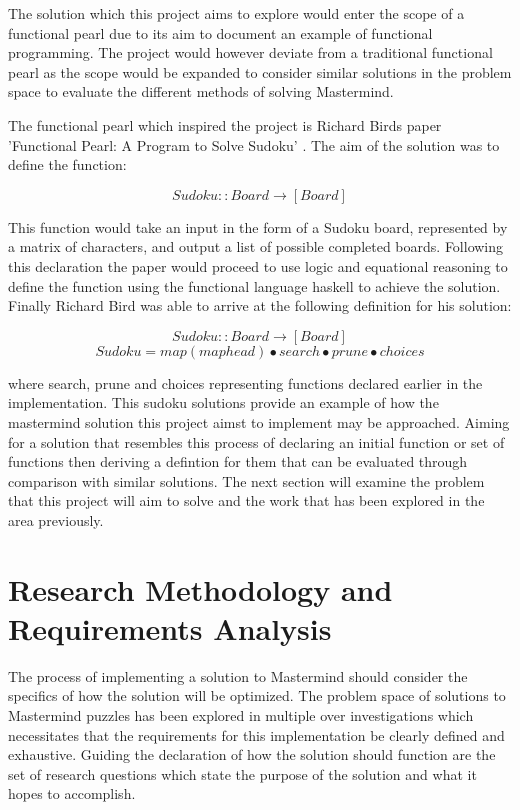 \documentclass[12pt]{article}  %
\theoremstyle{definition}
\theoremstyle{remark}
\begin{document}
The solution which this project aims to explore would enter the scope of a functional pearl due to its aim to document an example of functional programming. The project would however deviate from a traditional functional pearl as the scope would be expanded to consider similar solutions in the problem space to evaluate the different methods of solving Mastermind.

The functional pearl which inspired the project is Richard Birds paper 'Functional Pearl: A Program to Solve Sudoku' \cite{Sudoku}. The aim of the solution was to define the function:

\[ Sudoku :: Board \rightarrow [Board]\]

This function would take an input in the form of a Sudoku board, represented by a matrix of characters, and output a list of possible completed boards. Following this declaration the paper would proceed to use logic and equational reasoning to define the function using the functional language haskell to achieve the solution. Finally Richard Bird was able to arrive at the following definition for his solution:

\[ Sudoku :: Board \rightarrow [Board]\]
\[ Sudoku = map (map head) \bullet search \bullet prune \bullet choices\]

where search, prune and choices representing functions declared earlier in the implementation. This sudoku solutions provide an example of how the mastermind solution this project aimst to implement may be approached. Aiming for a solution that resembles this process of declaring an initial function or set of functions then deriving a defintion for them that can be evaluated through comparison with similar solutions. The next section will examine the problem that this project will aim to solve and the work that has been explored in the area previously.

\newpage                     %
\section{Research Methodology and Requirements Analysis}\label{ss:back}

The process of implementing a solution to Mastermind should consider the specifics of how the solution will be optimized. The problem space of solutions to Mastermind puzzles has been explored in multiple over investigations which necessitates that the requirements for this implementation be clearly defined and exhaustive. Guiding the declaration of how the solution should function are the set of research questions which state the purpose of the solution and what it hopes to accomplish.
\end{document}
